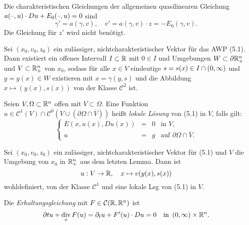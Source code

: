 \documentclass{cheat-sheet}
\DeclareMathOperator{\dive}{div} %
\begin{document}

\begin{bsp}
  Die charakteristischen Gleichungen der allgemeinen quasilinearen Gleichung $a(\text{--}, u) \cdot D u + E_0(\text{--}, u) = 0$ sind
  \[ \gamma' = a(\gamma, v), \quad v' = a(\gamma, v) \cdot z = - E_0(\gamma, v). \]
  Die Gleichung für $z'$ wird nicht benötigt.
\end{bsp}

\begin{lem}
  Sei $(x_0, v_0, z_0)$ ein zulässiger, nichtcharakteristischer Vektor für das AWP (5.1). Dann existiert ein offenes Intervall $I \subset \mathbb{R}$ mit $0 \in I$ und Umgebungen $W \subset \partial \mathbb{R}^n_{+}$ und $V \subset \mathbb{R}^n_+$ von $x_0$, sodass für alle $x \in V$ eindeutige $s = s(x) \in I \cap \left( 0, \infty \right)$ und $y = y(x) \in W$ existieren mit $x = \gamma(y, s)$ und die Abbildung $x \mapsto (y(x), s(x))$ von der Klasse $\mathcal{C}^2$ ist.
\end{lem}

\begin{defn}
  Seien $V, \Omega \subset \mathbb{R}^n$ offen mit $V \subset \Omega$. Eine Funktion $u \in \mathcal{C}^1(V) \cap \mathcal{C}^0(V \cup (\partial \Omega \cap \overline{V}))$ heißt \emph{lokale Lösung} von (5.1) in $V$, falls gilt:
  \[
    \left\{ \begin{array}{rlll}
      E(x, u(x), D u(x)) & = & 0 & \text{in } V, \\
      u & = & g & \text{auf } \partial \Omega \cap \overline{V}.
    \end{array} \right.
  \]
\end{defn}

\begin{satz}
  Sei $(x_0, v_0, z_0)$ ein zulässiger, nichtcharakteristischer Vektor für (5.1) und $V$ die Umgebung von $x_0$ in $\mathbb{R}^n_{+}$ aus dem letzten Lemma. Dann ist
  \[ u : V \to \mathbb{R}, \quad x \mapsto v(y(x), s(x)) \]
  wohldefiniert, von der Klasse $\mathcal{C}^1$ und eine lokale Lsg von (5.1) in $V$.
\end{satz}




\begin{prob}
  Die \emph{Erhaltungsgleichung} mit $F \in \mathcal{C}(\mathbb{R}, \mathbb{R}^n)$ ist
  \[
    \partial t u + \dive_x F(u) = \partial_t u + F'(u) \cdot Du = 0
    \quad \text{in } \ointerval{0}{\infty} \times \R^n.
  \]
\end{prob}
\end{document}
